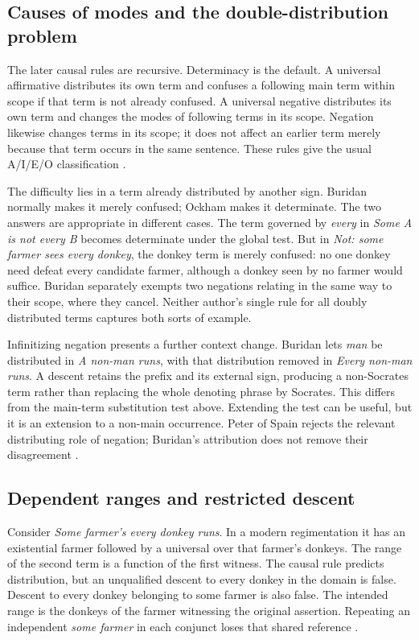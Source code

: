 \subsection{Causes of modes and the double-distribution problem}
\label{sec:p13-supposition-later-causes}

The later causal rules are recursive. Determinacy is the default. A
universal affirmative distributes its own term and confuses a following
main term within scope if that term is not already confused. A universal
negative distributes its own term and changes the modes of following
terms in its scope. Negation likewise changes terms in its scope;
it does not affect an earlier term merely because that term occurs in
the same sentence. These rules give the usual A/I/E/O classification
\cite[pp.~250--253]{Parsons2007FordhamSupposition}.

The difficulty lies in a term already distributed by another sign.
Buridan normally makes it merely confused; Ockham makes it determinate.
The two answers are appropriate in different cases. The term governed
by \emph{every} in \emph{Some A is not every B} becomes determinate
under the global test. But in \emph{Not: some farmer sees every
donkey}, the donkey term is merely confused: no one donkey need defeat
every candidate farmer, although a donkey seen by no farmer would
suffice. Buridan separately exempts two negations relating in the same
way to their scope, where they cancel. Neither author's single rule
for all doubly distributed terms captures both sorts of example.

Infinitizing negation presents a further context change. Buridan lets
\emph{man} be distributed in \emph{A non-man runs}, with that
distribution removed in \emph{Every non-man runs}. A descent retains
the prefix and its external sign, producing a non-Socrates term rather
than replacing the whole denoting phrase by Socrates. This differs
from the main-term substitution test above. Extending the test can be
useful, but it is an extension to a non-main occurrence. Peter of Spain
rejects the relevant distributing role of negation; Buridan's attribution
does not remove their disagreement
\cite[pp.~253--254]{Parsons2007FordhamSupposition}.

\subsection{Dependent ranges and restricted descent}
\label{sec:p13-supposition-dependent}

Consider \emph{Some farmer's every donkey runs}. In a modern
regimentation it has an existential farmer followed by a universal
over that farmer's donkeys. The range of the second term is a function
of the first witness. The causal rule predicts distribution, but an
unqualified descent to every donkey in the domain is false. Descent
to every donkey belonging to some farmer is also false. The intended
range is the donkeys of the farmer witnessing the original assertion.
Repeating an independent \emph{some farmer} in each conjunct loses
that shared reference
\cite[pp.~255--256]{Parsons2007FordhamSupposition}.

